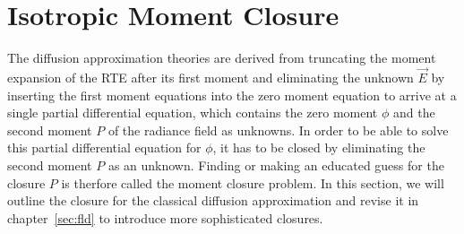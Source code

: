 \section{Isotropic Moment Closure}
\label{sec:moment_closure}

The diffusion approximation theories are derived from truncating the moment expansion of the RTE after its first moment and eliminating the unknown $\vec{E}$ by inserting the first moment equations into the zero moment equation to arrive at a single partial differential equation, which contains the zero moment $\phi$ and the second moment $P$ of the radiance field as unknowns. In order to be able to solve this partial differential equation for $\phi$, it has to be closed by eliminating the second moment $P$ as an unknown. Finding or making an educated guess for the closure $P$ is therfore called the moment closure problem. In this section, we will outline the closure for the classical diffusion approximation and revise it in chapter~\ref{sec:fld} to introduce more sophisticated closures.


